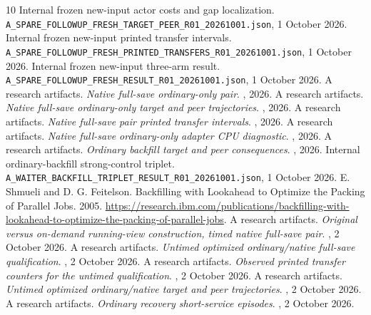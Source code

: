 \documentclass[10pt]{article}
\begin{document}
\begin{thebibliography}{10}
 Internal frozen new-input actor costs and gap localization. \nolinkurl{A_SPARE_FOLLOWUP_FRESH_TARGET_PEER_R01_20261001.json}, 1 October 2026.
 Internal frozen new-input printed transfer intervals. \nolinkurl{A_SPARE_FOLLOWUP_FRESH_PRINTED_TRANSFERS_R01_20261001.json}, 1 October 2026.
 Internal frozen new-input three-arm result. \nolinkurl{A_SPARE_FOLLOWUP_FRESH_RESULT_R01_20261001.json}, 1 October 2026.
 A research artifacts. \emph{Native full-save ordinary-only pair}. , 2026.
 A research artifacts. \emph{Native full-save ordinary-only target and peer trajectories}. , 2026.
 A research artifacts. \emph{Native full-save pair printed transfer intervals}. , 2026.
 A research artifacts. \emph{Native full-save ordinary-only adapter CPU diagnostic}. , 2026.
 A research artifacts. \emph{Ordinary backfill target and peer consequences}. , 2026.
 Internal ordinary-backfill strong-control triplet. \nolinkurl{A_WAITER_BACKFILL_TRIPLET_RESULT_R01_20261001.json}, 1 October 2026.
 E. Shmueli and D. G. Feitelson. Backfilling with Lookahead to Optimize the Packing of Parallel Jobs. 2005. \url{https://research.ibm.com/publications/backfilling-with-lookahead-to-optimize-the-packing-of-parallel-jobs}.
 A research artifacts. \emph{Original versus on-demand running-view construction, timed native full-save pair}. , 2 October 2026.
 A research artifacts. \emph{Untimed optimized ordinary/native full-save qualification}. , 2 October 2026.
 A research artifacts. \emph{Observed printed transfer counters for the untimed qualification}. , 2 October 2026.
 A research artifacts. \emph{Untimed optimized ordinary/native target and peer trajectories}. , 2 October 2026.
 A research artifacts. \emph{Ordinary recovery short-service episodes}. , 2 October 2026.

\end{thebibliography}
\end{document}

